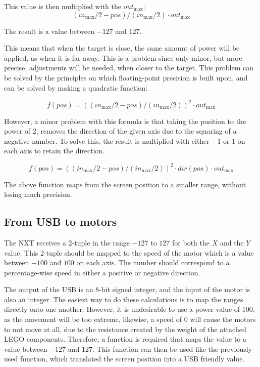 This value is then multiplied with the $out_\text{max}$:
$$
(in_\text{max}/2 - pos)/(in_\text{max}/2) \cdot out_\text{max}
$$

The result is a value between $-127$ and $127$.

This means that when the target is close, the same amount of power will be applied, as when it is far away.
This is a problem since only minor, but more precise, adjustments will be needed, when closer to the target.
This problem can be solved by the principles on which floating-point precision is built upon, and can be solved by making a quadratic function:

$$
f(pos) = ((in_\text{max}/2 - pos)/(in_\text{max}/2))^2 \cdot out_\text{max}
$$

However, a minor problem with this formula is that taking the position to the power of 2, removes the direction of the given axis due to the squaring of a negative number.
To solve this, the result is multiplied with either $-1$ or $1$ on each axis to retain the direction.

$$
f(pos) = ((in_\text{max}/2 - pos)/(in_\text{max}/2))^2 \cdot dir(pos) \cdot out_\text{max}
$$

The above function maps from the screen position to a smaller range, without losing much precision.

\subsection{From USB to motors}
The NXT receives a 2-tuple in the range $-127$ to $127$ for both the $X$ and the $Y$ value.
This 2-tuple should be mapped to the speed of the motor which is a value between $-100$ and $100$ on each axis.
The number should correspond to a percentage-wise speed in either a positive or negative direction.

The output of the USB is an 8-bit signed integer, and the input of the motor is also an integer.
The easiest way to do these calculations is to map the ranges directly onto one another.
However, it is undesirable to use a power value of 100, as the movement will be too extreme, likewise, a speed of 0 will cause the motors to not move at all, due to the resistance created by the weight of the attached LEGO components.
Therefore, a function is required that maps the value to a value between $-127$ and $127$.
This function can then be used like the previously used function, which translated the screen position into a USB friendly value.

